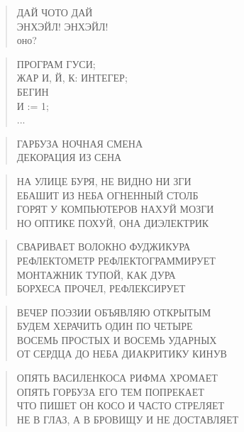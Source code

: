 \poemtitle{***}
\begin{verse}
ДАЙ ЧОТО ДАЙ\\
ЭНХЭЙЛ! ЭНХЭЙЛ!\\
оно?
\end{verse}

\poemtitle{***}
\begin{verse}
ПРОГРАМ ГУСИ;\\
ЖАР И, Й, К: ИНТЕГЕР;\\
БЕГИН\\
И := 1;\\
...
\end{verse}

\poemtitle{***}
\begin{verse}
ГАРБУЗА НОЧНАЯ СМЕНА\\
ДЕКОРАЦИЯ ИЗ СЕНА
\end{verse}

\poemtitle{***}
\begin{verse}
НА УЛИЦЕ БУРЯ, НЕ ВИДНО НИ ЗГИ\\
ЕБАШИТ ИЗ НЕБА ОГНЕННЫЙ СТОЛБ\\
ГОРЯТ У КОМПЬЮТЕРОВ НАХУЙ МОЗГИ\\
НО ОПТИКЕ ПОХУЙ, ОНА ДИЭЛЕКТРИК
\end{verse}

\poemtitle{***}
\begin{verse}
СВАРИВАЕТ ВОЛОКНО ФУДЖИКУРА\\
РЕФЛЕКТОМЕТР РЕФЛЕКТОГРАММИРУЕТ\\
МОНТАЖНИК ТУПОЙ, КАК ДУРА\\
БОРХЕСА ПРОЧЕЛ, РЕФЛЕКСИРУЕТ
\end{verse}

\poemtitle{***}
\begin{verse}
ВЕЧЕР ПОЭЗИИ ОБЪЯВЛЯЮ ОТКРЫТЫМ\\
БУДЕМ ХЕРАЧИТЬ ОДИН ПО ЧЕТЫРЕ\\
ВОСЕМЬ ПРОСТЫХ И ВОСЕМЬ УДАРНЫХ\\
ОТ СЕРДЦА ДО НЕБА ДИАКРИТИКУ КИНУВ
\end{verse}

\poemtitle{***}
\begin{verse}
ОПЯТЬ ВАСИЛЕНКОСА РИФМА ХРОМАЕТ\\
ОПЯТЬ ГОРБУЗА ЕГО ТЕМ ПОПРЕКАЕТ\\
ЧТО ПИШЕТ ОН КОСО И ЧАСТО СТРЕЛЯЕТ\\
НЕ В ГЛАЗ, А В БРОВИЩУ И НЕ ДОСТАВЛЯЕТ
\end{verse}

